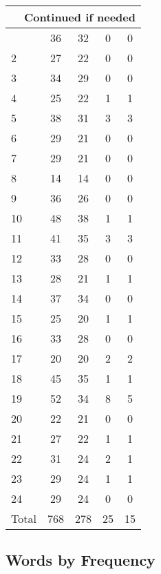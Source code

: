 \begin{center}
\begin{longtable}{l|c|c|c|c}
\hline \multicolumn{5}{|r|}{{Continued if needed}} \\ \hline
\endfoot 
1 & 36 & 32 & 0 & 0\\ \hline
2 & 27 & 22 & 0 & 0\\ \hline
3 & 34 & 29 & 0 & 0\\ \hline
4 & 25 & 22 & 1 & 1\\ \hline
5 & 38 & 31 & 3 & 3\\ \hline
6 & 29 & 21 & 0 & 0\\ \hline
7 & 29 & 21 & 0 & 0\\ \hline
8 & 14 & 14 & 0 & 0\\ \hline
9 & 36 & 26 & 0 & 0\\ \hline
10 & 48 & 38 & 1 & 1\\ \hline
11 & 41 & 35 & 3 & 3\\ \hline
12 & 33 & 28 & 0 & 0\\ \hline
13 & 28 & 21 & 1 & 1\\ \hline
14 & 37 & 34 & 0 & 0\\ \hline
15 & 25 & 20 & 1 & 1\\ \hline
16 & 33 & 28 & 0 & 0\\ \hline
17 & 20 & 20 & 2 & 2\\ \hline
18 & 45 & 35 & 1 & 1\\ \hline
19 & 52 & 34 & 8 & 5\\ \hline
20 & 22 & 21 & 0 & 0\\ \hline
21 & 27 & 22 & 1 & 1\\ \hline
22 & 31 & 24 & 2 & 1\\ \hline
23 & 29 & 24 & 1 & 1\\ \hline
24 & 29 & 24 & 0 & 0\\ \hline
\hline \hline
Total & 768 & 278 & 25 & 15



\end{longtable}
\end{center}

 
\subsection{Words by Frequency}

